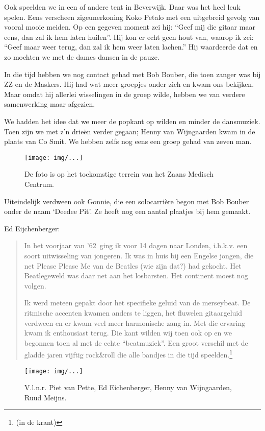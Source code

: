 \documentclass[10pt,twoside,openright]{memoir}
\begin{document}
Ook speelden we in een of andere tent in Beverwijk. Daar was het heel leuk spelen. Eens verscheen zigeunerkoning Koko Petalo met een uitgebreid gevolg van vooral mooie meiden. Op een gegeven moment zei hij: ``Geef mij die gitaar maar eens, dan zal ik hem laten huilen''. Hij kon er echt geen hout van, waarop ik zei: ``Geef maar weer terug, dan zal ik hem weer laten lachen.'' Hij waardeerde dat en zo mochten we met de dames dansen in de pauze.

In die tijd hebben we nog contact gehad met Bob Bouber, die toen zanger was bij ZZ en de Maskers. Hij had wat meer groepjes onder zich en kwam ons bekijken. Maar omdat hij allerlei wisselingen in de groep wilde, hebben we van verdere samenwerking maar afgezien. 

We hadden het idee dat we meer de popkant op wilden en minder de dansmuziek. Toen zijn we met z’n drieën verder gegaan; Henny van Wijngaarden kwam in de plaats van Co Smit. We hebben zelfs nog eens een groep gehad van zeven man.

\begin{figure}[t]
\texttt{[image: img/...]}
\caption{De foto is op het toekomstige terrein van het Zaans Medisch Centrum.}
\end{figure}

Uiteindelijk verdween ook Gonnie, die een solocarrière begon met Bob Bouber onder de naam `Deedee Pit'. Ze heeft nog een aantal plaatjes bij hem gemaakt.

Ed Eijchenberger: 

\begin{quote}
In het voorjaar van '62 ging ik voor 14 dagen naar Londen, i.h.k.v. een soort uitwisseling van jongeren. Ik was in huis bij een Engelse jongen, die net Please Please Me van de Beatles (wie zijn dat?) had gekocht. Het Beatlegeweld was daar net aan het losbarsten. Het continent moest nog volgen. 

Ik werd meteen gepakt door het specifieke geluid van de merseybeat. De ritmische accenten kwamen anders te liggen, het fluwelen gitaargeluid verdween en er kwam veel meer harmonische zang in. Met die ervaring kwam ik enthousiast terug. Die kant wilden wij toen ook op en we begonnen toen al met de echte “beatmuziek”. Een groot verschil met de gladde jaren vijftig rock&roll die alle bandjes in die tijd speelden.\footnote{(in de krant)}
\end{quote}

\begin{figure}[t]
\texttt{[image: img/...]}
\caption{V.l.n.r. Piet van Pette, Ed Eichenberger, Henny van Wijngaarden, Ruud Meijns.}
\end{figure}
 
\end{document}
